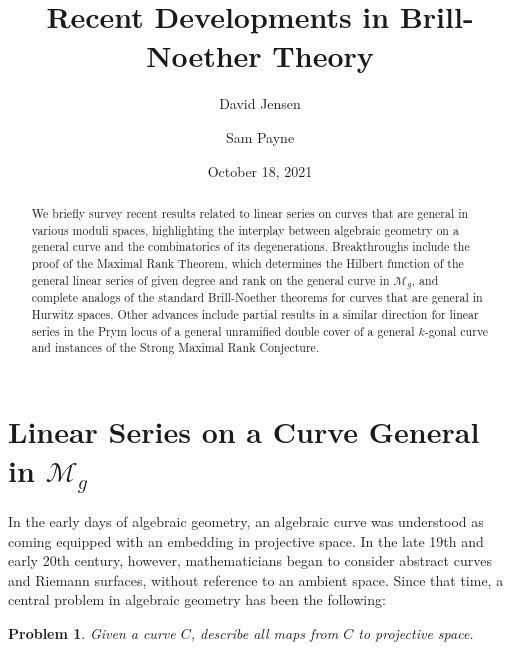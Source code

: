 \documentclass{amsart}
\newtheorem{problem}[theorem]{Problem}
\theoremstyle{definition}
\begin{document}
\title{Recent Developments in Brill-Noether Theory}
\author[D. Jensen]{David Jensen}
\address{David Jensen: Department of Mathematics,  University of Kentucky \hfill \newline\texttt{}
 Patterson Office Tower,
Lexington, KY 40506--0027, USA}
\author[S. Payne]{Sam Payne}
\address{Sam Payne: Department of Mathematics,  University of Texas at Austin \hfill \newline\texttt{}
 Speedway, RLM 8.100,
Austin, TX 78712, USA}
\date{October 18, 2021}



\maketitle

\begin{abstract}
We briefly survey recent results related to linear series on curves that are general in various moduli spaces, highlighting the interplay between algebraic geometry on a general curve and the combinatorics of its degenerations.  Breakthroughs include the  proof of the Maximal Rank Theorem, which determines the Hilbert function of the general linear series of given degree and rank on the general curve in $\mathcal{M}_g$, and complete analogs of the standard Brill-Noether theorems for curves that are general in Hurwitz spaces. Other advances include partial results in a similar direction for linear series in the Prym locus of a general unramified double cover of a general $k$-gonal curve and instances of the Strong Maximal Rank Conjecture.
\end{abstract}





\section{Linear Series on a Curve General in $\mathcal{M}_g$}
\label{Sec:BN}

In the early days of algebraic geometry, an algebraic curve was understood as coming equipped with an embedding in projective space.  In the late 19th and early 20th century, however, mathematicians began to consider abstract curves and Riemann surfaces, without reference to an ambient space.  Since that time, a central problem in algebraic geometry has been the following:

\begin{problem} \label{prob:BN}
Given a curve $C$, describe all maps from $C$ to projective space.
\end{problem}
\end{document}
